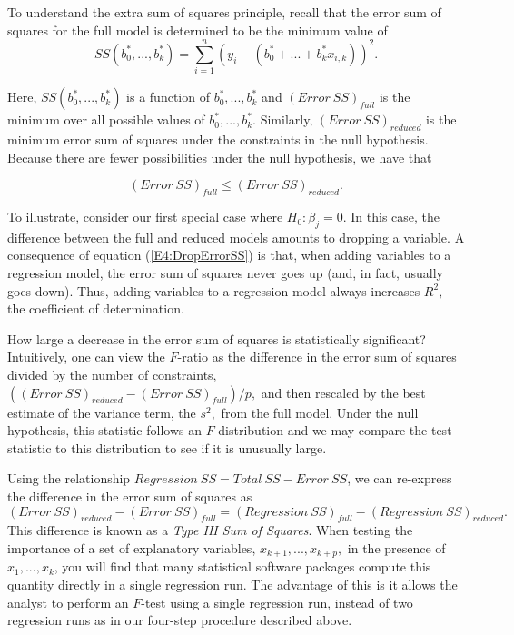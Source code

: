 To understand the extra sum of squares principle, recall that the
error sum of squares for the full model is determined to be the
minimum value of
\begin{equation*}
SS(b_0^{\ast },...,b_k^{\ast })=\sum_{i=1}^{n}\left( y_i-\left(
b_0^{\ast }+...+b_k^{\ast }x_{i,k}\right) \right) ^{2}.
\end{equation*}

\noindent Here, $SS(b_0^{\ast },...,b_k^{\ast })$ is a function of
$b_0^{\ast },...,b_k^{\ast }$ and $(Error~SS)_{full}$ is the minimum
over all
possible values of $b_0^{\ast },...,b_k^{\ast }$. Similarly, $%
(Error~SS)_{reduced}$ is the minimum error sum of squares under the
constraints in the null hypothesis. Because there are fewer
possibilities under the null hypothesis, we have that

\begin{equation}\label{E4:DropErrorSS}
(Error~SS)_{full}\leq (Error~SS)_{reduced}.
\end{equation}

To illustrate, consider our first special case where $H_0 : \beta_j
= 0$. In this case, the difference between the full and reduced
models amounts to dropping a variable. A consequence of equation
(\ref{E4:DropErrorSS}) is that, when adding variables to a
regression model, the error sum of squares never goes up (and, in
fact, usually goes down). Thus, adding variables to a regression
model always increases $R^2,$ the coefficient of determination.

How large a decrease in the error sum of squares is statistically
significant? Intuitively, one can view the $F$-ratio as the
difference in the error sum of squares divided by the number of
constraints, $((Error~SS)_{reduced}-(Error~SS)_{full})/p,$ and then
rescaled by the best estimate of the variance term, the $s^{2},$
from the full model. Under the null hypothesis, this statistic
follows an $F$-distribution and we may compare the test statistic to
this distribution to see if it is unusually large.

Using the relationship $Regression~SS=Total~SS-Error~SS$, we can
re-express the difference in the error sum of squares as
\begin{equation*}
(Error~SS)_{reduced}-(Error~SS)_{full}=(Regression~SS)_{full}-(Regression~SS)_{reduced}.
\end{equation*} 
This difference is known as a \emph{Type III Sum of Squares}. When
testing the importance of a set of explanatory variables,
$x_{k+1},...,x_{k+p},$ in the presence of $x_1,...,x_k$, you will
find that many statistical software packages compute this quantity
directly in a single regression run. The advantage of this is it
allows the analyst to perform an $F$-test using a single regression
run, instead of two regression runs as in our four-step procedure
described above.

